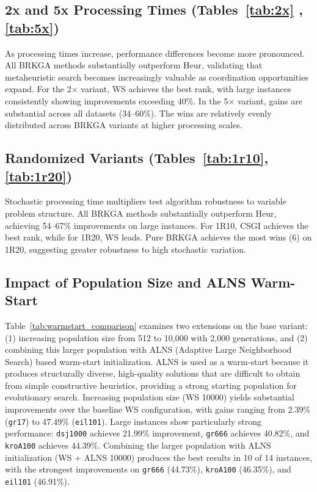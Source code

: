 \documentclass[sigconf]{acmart}
\begin{document}
\subsection{2x and 5x Processing Times (Tables~\ref{tab:2x} , \ref{tab:5x})} 

As processing times increase, performance differences become more pronounced. All BRKGA methods substantially outperform Heur, validating that metaheuristic search becomes increasingly valuable as coordination opportunities expand. For the 2× variant, WS achieves the best rank, with large instances consistently showing improvements exceeding 40\%. In the 5× variant, gains are substantial across all datasets (34–60\%). The wins are relatively evenly distributed across BRKGA variants at higher processing scales.

\subsection{Randomized Variants (Tables~\ref{tab:1r10}, \ref{tab:1r20})} 
Stochastic processing time multipliers test algorithm robustness to variable problem structure. All BRKGA methods substantially outperform Heur, achieving 54–67\% improvements on large instances. For 1R10, CSGI achieves the best rank, while for 1R20, WS leads. Pure BRKGA achieves the most wins (6) on 1R20, suggesting greater robustness to high stochastic variation.

\subsection{Impact of Population Size and ALNS Warm-Start}
Table~\ref{tab:warmstart_comparison} examines two extensions on the base variant: (1) increasing population size from 512 to 10,000 with 2,000 generations, and (2) combining this larger population with ALNS (Adaptive Large Neighborhood Search) based warm-start initialization. ALNS is used as a warm-start because it produces structurally diverse, high-quality solutions that are difficult to obtain from simple constructive heuristics, providing a strong starting population for evolutionary search. Increasing population size (WS 10000) yields substantial improvements over the baseline WS configuration, with gains ranging from 2.39\% (\texttt{gr17}) to 47.49\% (\texttt{eil101}). Large instances show particularly strong performance: \texttt{dsj1000} achieves 21.99\% improvement, \texttt{gr666} achieves 40.82\%, and \texttt{kroA100} achieves 44.39\%. Combining the larger population with ALNS initialization (WS + ALNS 10000) produces the best results in 10 of 14 instances, with the strongest improvements on \texttt{gr666} (44.73\%), \texttt{kroA100} (46.35\%), and \texttt{eil101} (46.91\%). 
\end{document}
